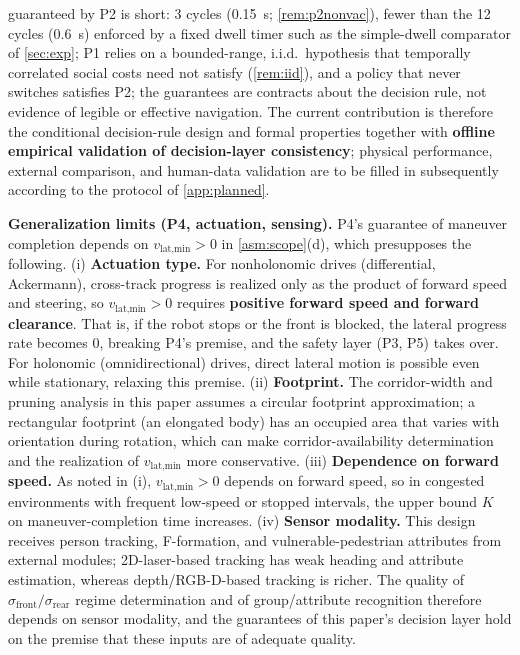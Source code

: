guaranteed by P2 is short: 3 cycles (0.15~s; \cref{rem:p2nonvac}), fewer than the 12 cycles (0.6~s) enforced by a fixed dwell timer such as the simple-dwell comparator of \cref{sec:exp}; P1 relies on a bounded-range, i.i.d.\ hypothesis that temporally correlated social costs need not satisfy (\cref{rem:iid}), and a policy that never switches satisfies P2; the guarantees are contracts about the decision rule, not evidence of legible or effective navigation. The current contribution is therefore the conditional decision-rule design and formal properties together with \textbf{offline empirical validation of decision-layer consistency}; physical performance, external comparison, and human-data validation are to be filled in subsequently according to the protocol of \cref{app:planned}.

\noindent\textbf{Generalization limits (P4, actuation, sensing).} P4's guarantee of maneuver completion depends on $v_{\text{lat,min}} > 0$ in \cref{asm:scope}(d), which presupposes the following. (i) \textbf{Actuation type.} For nonholonomic drives (differential, Ackermann), cross-track progress is realized only as the product of forward speed and steering, so $v_{\text{lat,min}} > 0$ requires \textbf{positive forward speed and forward clearance}. That is, if the robot stops or the front is blocked, the lateral progress rate becomes 0, breaking P4's premise, and the safety layer (P3, P5) takes over. For holonomic (omnidirectional) drives, direct lateral motion is possible even while stationary, relaxing this premise. (ii) \textbf{Footprint.} The corridor-width and pruning analysis in this paper assumes a circular footprint approximation; a rectangular footprint (an elongated body) has an occupied area that varies with orientation during rotation, which can make corridor-availability determination and the realization of $v_{\text{lat,min}}$ more conservative. (iii) \textbf{Dependence on forward speed.} As noted in (i), $v_{\text{lat,min}} > 0$ depends on forward speed, so in congested environments with frequent low-speed or stopped intervals, the upper bound $K$ on maneuver-completion time increases. (iv) \textbf{Sensor modality.} This design receives person tracking, F-formation, and vulnerable-pedestrian attributes from external modules; 2D-laser-based tracking has weak heading and attribute estimation, whereas depth/RGB-D-based tracking is richer. The quality of $\sigma_{\text{front}}/\sigma_{\text{rear}}$ regime determination and of group/attribute recognition therefore depends on sensor modality, and the guarantees of this paper's decision layer hold on the premise that these inputs are of adequate quality.

